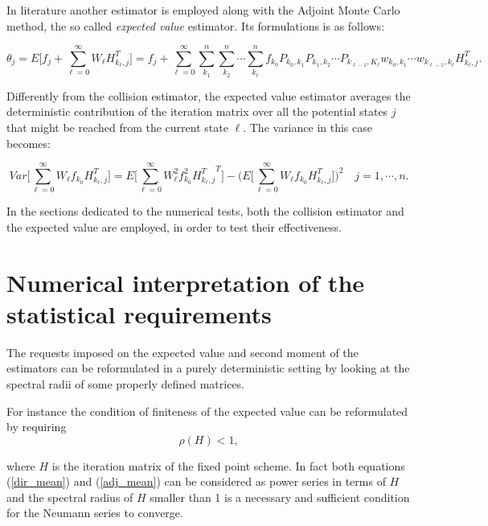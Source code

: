 \documentclass[a4paper,10pt]{article}
\begin{document}
In literature another estimator is employed along with the Adjoint Monte Carlo
method, the so called \textit{expected value} estimator. Its 
formulations is as follows: 

\begin{equation}
\theta_j=E\bigg[f_j + \sum_{\ell=0}^\infty 
W_{\ell}H_{k_{\ell}, j}^T\bigg]=f_j 
+ \sum_{\ell=0}^{\infty}\sum_{k_1}^n\sum_{k_2} ^n\cdots\sum_ { k_ { \ell}}^n 
f_{k_0}P_{k_0,k_1}P_{k_1,k_2}\cdots P_{k_{\ell-1},K_{\ell}}w_{k_0,k_1}\cdots 
w_{k_{\ell-1},k_{\ell}}H_{k_{\ell},j}^T.
\label{adj_mean1}
\end{equation}

Differently from the collision estimator, the expected value estimator averages 
the deterministic contribution of the iteration matrix over all the potential 
states $j$ that might be reached from the current state $\ell$. The variance 
in this case becomes: 

\begin{equation}
Var\bigg [\sum_{\ell=0}^\infty W_{\ell} 
f_{k_0}H_{k_{\ell},j}^T\bigg]=E\bigg[\sum_{\ell=0}^\infty W_{\ell}^2 
f_{k_0}^2 {H_{k_{\ell},j}^T}^T\bigg ] - \bigg (E\bigg[\sum_{\ell=0}^\infty 
W_{\ell} 
f_{k_0}H_{k_{\ell},j}^T\bigg]\bigg )^2\quad j=1,\cdots,n
\label{adj_var}.
\end{equation}

In the sections dedicated to the numerical tests, both the collision estimator 
and the expected value are employed, in order to test their effectiveness. 

\section{Numerical interpretation of the statistical requirements}
The requests imposed on the expected value and second moment of the estimators 
can be reformulated in a purely deterministic setting by looking at the 
spectral radii of some properly defined matrices. 

For instance the condition of finiteness of the expected value can be 
reformulated by requiring 
\begin{equation}
 \rho(H)<1
 \label{rho_h},
\end{equation}

where $H$ is the iteration matrix of the fixed point scheme.
In fact both equations (\ref{dir_mean}) and (\ref{adj_mean}) can be considered 
as 
power series in terms of $H$ and the spectral radius of $H$ smaller 
than 1 is a necessary and sufficient condition for the Neumann series to 
converge.
\end{document}

